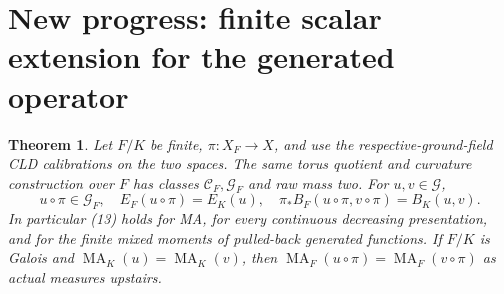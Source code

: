 \documentclass[11pt]{article}
\newtheorem{theorem}{Theorem}
\newcommand{\C}{\mathcal C}
\newcommand{\G}{\mathcal G}
\newcommand{\MA}{\operatorname{MA}}
\begin{document}
\section{New progress: finite scalar extension for the generated operator}
\begin{theorem}\label{finite}
Let $F/K$ be finite, $\pi:X_F\to X$, and use the respective-ground-field
CLD calibrations on the two spaces. The same torus quotient and curvature
construction over $F$ has classes $\C_F,\G_F$ and raw mass two.
For $u,v\in\G$,
\[
 u\circ\pi\in\G_F,\quad E_F(u\circ\pi)=E_K(u),\quad
 \pi_*B_F(u\circ\pi,v\circ\pi)=B_K(u,v).                   \tag{13}
\]
In particular (13) holds for MA, for every continuous decreasing presentation,
and for the finite mixed moments of pulled-back generated functions.
If $F/K$ is Galois and $\MA_K(u)=\MA_K(v)$, then
$\MA_F(u\circ\pi)=\MA_F(v\circ\pi)$ as actual measures upstairs.
\end{theorem}
\end{document}
